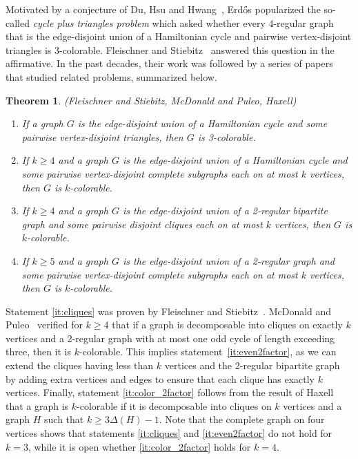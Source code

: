 \documentclass[11pt,a4paper]{article}
\theoremstyle{plain}
\newtheorem{thm}{Theorem}
\theoremstyle{definition}
\begin{document}
Motivated by a conjecture of Du, Hsu and Hwang~\cite{du1993hamiltonian}, Erd\H{o}s \cite{erdos1990some} popularized the so-called \emph{cycle plus triangles problem} which asked whether every 4-regular graph that is the edge-disjoint union of a Hamiltonian cycle and pairwise vertex-disjoint triangles is 3-colorable. Fleischner and Stiebitz~\cite{fleischner1992solution} answered this question in the affirmative. In the past decades, their work was followed by a series of papers that studied related problems, summarized below.

\begin{thm}{\normalfont(Fleischner and Stiebitz, McDonald and Puleo, Haxell)} \label{thm:chromatic} 
\begin{enumerate}[label=(\alph*)]\itemsep0em 
\item If a graph $G$ is the edge-disjoint union of a Hamiltonian cycle and some pairwise vertex-disjoint triangles, then $G$ is 3-colorable. \label{it:triangles}
\item If $k \ge 4$ and a graph $G$ is the edge-disjoint union of a Hamiltonian cycle and some pairwise vertex-disjoint complete subgraphs each on at most $k$ vertices, then $G$ is $k$-colorable. \label{it:cliques}
\item If $k \ge 4$ and a graph $G$ is the edge-disjoint union of a 2-regular bipartite graph and some pairwise disjoint cliques each on at most $k$ vertices, then $G$ is $k$-colorable. \label{it:even2factor}
\item If $k \ge 5$ and a graph $G$ is the edge-disjoint union of a 2-regular graph and some pairwise vertex-disjoint complete subgraphs each on at most $k$ vertices, then $G$ is $k$-colorable. \label{it:color_2factor}
\end{enumerate}
\end{thm}

Statement \ref{it:cliques} was proven by Fleischner and Stiebitz~\cite{fleischner1997remarks}. McDonald and Puleo~\cite{mcdonald2022strong} verified for $k \ge 4$ that if a graph is decomposable into cliques on exactly $k$ vertices and a 2-regular graph with at most one odd cycle of length exceeding three, then it is $k$-colorable. This implies statement~\ref{it:even2factor}, as we can extend the cliques having less than $k$ vertices and the 2-regular bipartite graph by adding extra vertices and edges to ensure that each clique has exactly $k$ vertices. Finally, statement \ref{it:color_2factor} follows from the result of Haxell~\cite{haxell2004strong} that a graph is $k$-colorable if it is decomposable into cliques on $k$ vertices and a graph $H$ such that $k \ge 3\Delta(H)-1$. Note that the complete graph on four vertices shows that statements \ref{it:cliques} and \ref{it:even2factor} do not hold for $k=3$, while it is open whether \ref{it:color_2factor} holds for $k=4$. 
\end{document}
